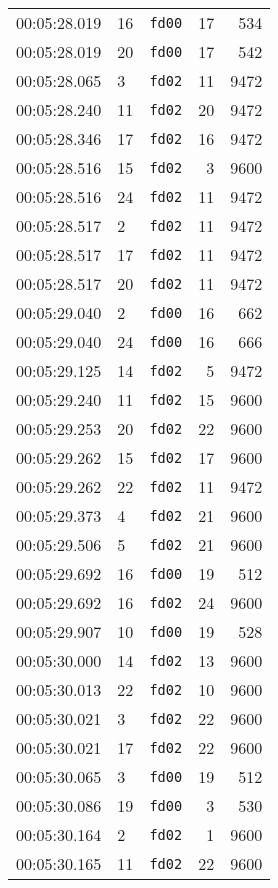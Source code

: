 \documentclass{article}
\begin{document}
\begin{longtable}{lllrr}
00:05:28.019 & 16 & \texttt{fd00} & 17 & 534 \\
00:05:28.019 & 20 & \texttt{fd00} & 17 & 542 \\
00:05:28.065 & 3 & \texttt{fd02} & 11 & 9472 \\
00:05:28.240 & 11 & \texttt{fd02} & 20 & 9472 \\
00:05:28.346 & 17 & \texttt{fd02} & 16 & 9472 \\
00:05:28.516 & 15 & \texttt{fd02} & 3 & 9600 \\
00:05:28.516 & 24 & \texttt{fd02} & 11 & 9472 \\
00:05:28.517 & 2 & \texttt{fd02} & 11 & 9472 \\
00:05:28.517 & 17 & \texttt{fd02} & 11 & 9472 \\
00:05:28.517 & 20 & \texttt{fd02} & 11 & 9472 \\
00:05:29.040 & 2 & \texttt{fd00} & 16 & 662 \\
00:05:29.040 & 24 & \texttt{fd00} & 16 & 666 \\
00:05:29.125 & 14 & \texttt{fd02} & 5 & 9472 \\
00:05:29.240 & 11 & \texttt{fd02} & 15 & 9600 \\
00:05:29.253 & 20 & \texttt{fd02} & 22 & 9600 \\
00:05:29.262 & 15 & \texttt{fd02} & 17 & 9600 \\
00:05:29.262 & 22 & \texttt{fd02} & 11 & 9472 \\
00:05:29.373 & 4 & \texttt{fd02} & 21 & 9600 \\
00:05:29.506 & 5 & \texttt{fd02} & 21 & 9600 \\
00:05:29.692 & 16 & \texttt{fd00} & 19 & 512 \\
00:05:29.692 & 16 & \texttt{fd02} & 24 & 9600 \\
00:05:29.907 & 10 & \texttt{fd00} & 19 & 528 \\
00:05:30.000 & 14 & \texttt{fd02} & 13 & 9600 \\
00:05:30.013 & 22 & \texttt{fd02} & 10 & 9600 \\
00:05:30.021 & 3 & \texttt{fd02} & 22 & 9600 \\
00:05:30.021 & 17 & \texttt{fd02} & 22 & 9600 \\
00:05:30.065 & 3 & \texttt{fd00} & 19 & 512 \\
00:05:30.086 & 19 & \texttt{fd00} & 3 & 530 \\
00:05:30.164 & 2 & \texttt{fd02} & 1 & 9600 \\
00:05:30.165 & 11 & \texttt{fd02} & 22 & 9600 \\

\end{longtable}
\end{document}
